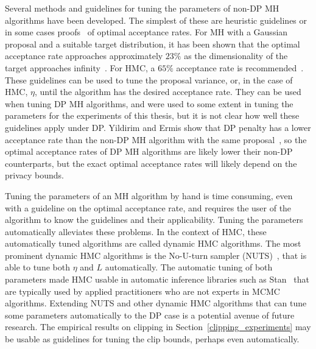 \documentclass[english,twoside,openright]{HYgraduMLDS}
\begin{document}
Several methods and guidelines for tuning the parameters of non-DP MH algorithms
have been developed. The simplest of these are heuristic guidelines or in some
cases proofs~\cite{RGG97} of optimal acceptance rates. For MH with a Gaussian
proposal and a suitable target distribution, it has been shown that the optimal
acceptance rate approaches approximately \(23\%\) as the dimensionality of the
target approaches infinity~\cite{RGG97}. For HMC, a \(65\%\) acceptance rate
is recommended~\cite{neal2012mcmc}. These guidelines can be used to tune the
proposal variance,
or, in the case of HMC, \(\eta\), until the algorithm has the desired acceptance
rate. They can be used when tuning DP MH algorithms, and were used to some
extent in tuning the parameters for the experiments of this thesis, but it
is not clear how well these guidelines apply under DP.
Yildirim and Ermis show that DP penalty has a lower acceptance
rate than the non-DP MH algorithm with the same proposal~\cite{YildirimE19},
so the optimal
acceptance rates of DP MH algorithms are likely lower their non-DP
counterparts, but the exact optimal acceptance rates will likely depend on the
privacy bounds.

Tuning the parameters of an MH algorithm by hand is time consuming,
even with a guideline on the optimal acceptance rate, and requires the user of
the algorithm to know the guidelines and their applicability. Tuning the
parameters automatically alleviates these problems. In the context of HMC, these
automatically tuned algorithms are called dynamic HMC algorithms. The most
prominent dynamic HMC algorithms is the No-U-turn sampler (NUTS)~\cite{HoG14},
that is able to tune both \(\eta\) and \(L\) automatically.
The automatic tuning of both parameters made HMC usable in automatic inference
libraries such as
Stan~\cite{stan} that are typically used by applied practitioners who are not
experts in MCMC algorithms. Extending NUTS and other dynamic HMC algorithms that
can tune some parameters automatically to the DP case is a potential avenue of
future research. The empirical results on clipping in
Section~\ref{clipping_experiments} may be usable as guidelines for tuning the
clip bounds, perhaps even automatically.
\end{document}
